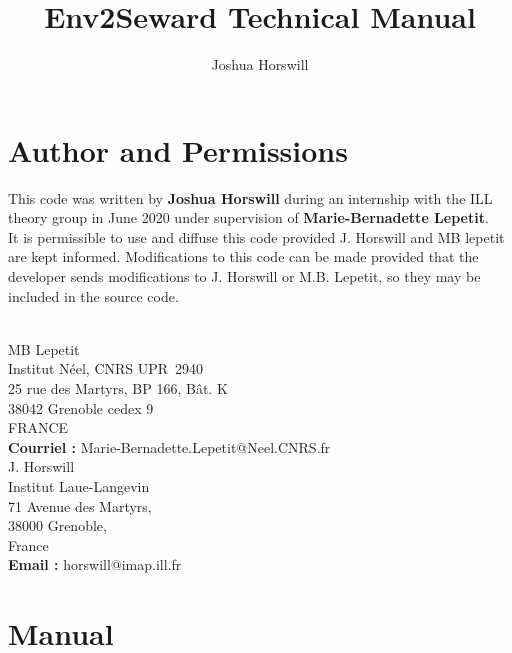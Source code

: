 \documentclass[10pt]{article}
\author{Joshua Horswill}
\title{Env2Seward Technical Manual}
\begin{document}
\maketitle
\tableofcontents

\section{Author and Permissions}
This code was written by {\bf Joshua Horswill} during an internship with the ILL theory group in June 2020 under supervision of {\bf Marie-Bernadette Lepetit}. 
\\

It is permissible to use and diffuse this code provided J. Horswill and MB lepetit are kept informed. Modifications to this code can be made provided that the developer sends modifications to J. Horswill or M.B. Lepetit, so they may be included in the source code.
\\
\\

\hspace*{3cm}                
\begin{minipage}{10cm}
	MB Lepetit \\
	Institut Néel, CNRS UPR~2940 \\                       
	25 rue des Martyrs, BP 166, Bât. K\\
	38042 Grenoble cedex 9 \\
	FRANCE \\[+1ex]                                          
	{\bf Courriel :} Marie-Bernadette.Lepetit@Neel.CNRS.fr  \\
	
	J. Horswill \\
	Institut Laue-Langevin\\            
	71 Avenue des Martyrs,\\  
	38000 Grenoble,\\
	France\\[+1ex]                                          
	{\bf Email :} horswill@imap.ill.fr  \\
\end{minipage}
\section{Manual}
\end{document}

